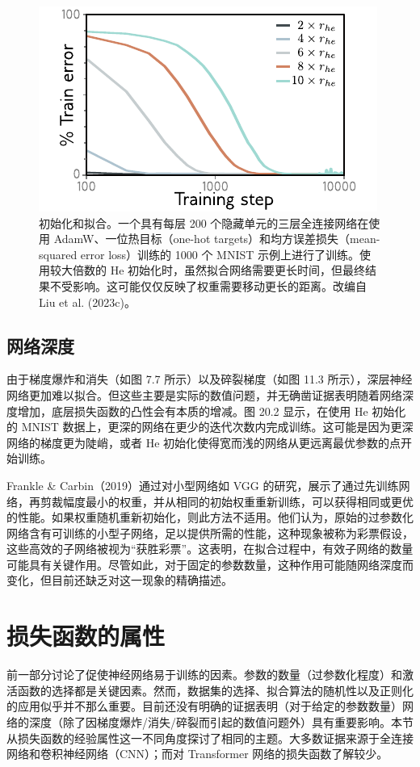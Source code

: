 \documentclass[lang=cn,newtx,10pt,scheme=chinese]{elegantbook}
\begin{document}
\begin{figure}[ht!]
\centering
\includegraphics[width=0.7\linewidth]{PDFFigures/UDLChap21PDF/WhyOmniGrok2.pdf}
\caption{初始化和拟合。一个具有每层 200 个隐藏单元的三层全连接网络在使用 AdamW、一位热目标（one-hot targets）和均方误差损失（mean-squared error loss）训练的 1000 个 MNIST 示例上进行了训练。使用较大倍数的 He 初始化时，虽然拟合网络需要更长时间，但最终结果不受影响。这可能仅仅反映了权重需要移动更长的距离。改编自 Liu et al. (2023c)。}
\end{figure}

\subsection{网络深度}
由于梯度爆炸和消失（如图 7.7 所示）以及碎裂梯度（如图 11.3 所示），深层神经网络更加难以拟合。但这些主要是实际的数值问题，并无确凿证据表明随着网络深度增加，底层损失函数的凸性会有本质的增减。图 20.2 显示，在使用 He 初始化的 MNIST 数据上，更深的网络在更少的迭代次数内完成训练。这可能是因为更深网络的梯度更为陡峭，或者 He 初始化使得宽而浅的网络从更远离最优参数的点开始训练。

Frankle \& Carbin（2019）通过对小型网络如 VGG 的研究，展示了通过先训练网络，再剪裁幅度最小的权重，并从相同的初始权重重新训练，可以获得相同或更优的性能。如果权重随机重新初始化，则此方法不适用。他们认为，原始的过参数化网络含有可训练的小型子网络，足以提供所需的性能，这种现象被称为彩票假设，这些高效的子网络被视为“获胜彩票”。这表明，在拟合过程中，有效子网络的数量可能具有关键作用。尽管如此，对于固定的参数数量，这种作用可能随网络深度而变化，但目前还缺乏对这一现象的精确描述。

\section{损失函数的属性}
前一部分讨论了促使神经网络易于训练的因素。参数的数量（过参数化程度）和激活函数的选择都是关键因素。然而，数据集的选择、拟合算法的随机性以及正则化的应用似乎并不那么重要。目前还没有明确的证据表明（对于给定的参数数量）网络的深度（除了因梯度爆炸/消失/碎裂而引起的数值问题外）具有重要影响。本节从损失函数的经验属性这一不同角度探讨了相同的主题。大多数证据来源于全连接网络和卷积神经网络（CNN）；而对 Transformer 网络的损失函数了解较少。
\end{document}
